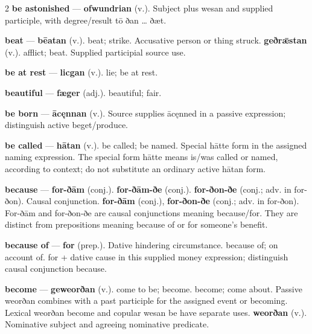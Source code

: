 \begin{multicols}{2}
\textbf{be astonished} — \textbf{ofwundrian} (v.). Subject plus wesan and supplied participle, with degree/result tō ðan … ðæt.\par
\textbf{beat} — \textbf{bēatan} (v.). beat; strike. Accusative person or thing struck. \textbf{geðrǣstan} (v.). afflict; beat. Supplied participial source use.\par
\textbf{be at rest} — \textbf{licgan} (v.). lie; be at rest.\par
\textbf{beautiful} — \textbf{fæger} (adj.). beautiful; fair.\par
\textbf{be born} — \textbf{ācęnnan} (v.). Source supplies ācęnned in a passive expression; distinguish active beget/produce.\par
\textbf{be called} — \textbf{hātan} (v.). be called; be named. Special hātte form in the assigned naming expression. The special form hātte means is/was called or named, according to context; do not substitute an ordinary active hātan form.\par
\textbf{because} — \textbf{for-ðām} (conj.).  \textbf{for-ðām-ðe} (conj.).  \textbf{for-ðon-ðe} (conj.; adv. in for-ðon). Causal conjunction. \textbf{for-ðām} (conj.), \textbf{for-ðon-ðe} (conj.; adv. in for-ðon). For-ðām and for-ðon-ðe are causal conjunctions meaning because/for. They are distinct from prepositions meaning because of or for someone’s benefit.\par
\textbf{because of} — \textbf{for} (prep.). Dative hindering circumstance. because of; on account of. for + dative cause in this supplied money expression; distinguish causal conjunction because.\par
\textbf{become} — \textbf{geweorðan} (v.). come to be; become. become; come about. Passive weorðan combines with a past participle for the assigned event or becoming. Lexical weorðan become and copular wesan be have separate uses. \textbf{weorðan} (v.). Nominative subject and agreeing nominative predicate.\par

\end{multicols}

